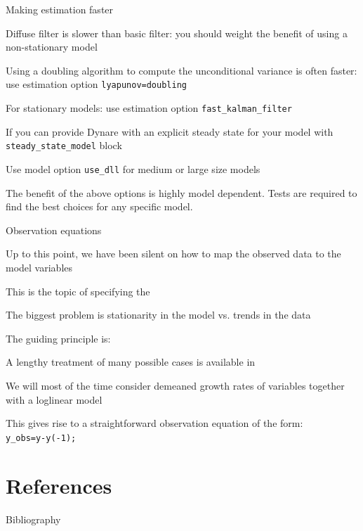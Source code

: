 \documentclass[handout,usepdftitle=false,xcolor=dvipsnames,aspectratio=169]{beamer}
\begin{document}
\begin{frame}{Making estimation faster}
  \begin{witemize}
    \item Diffuse filter is slower than basic filter: you should weight the benefit of using a non-stationary model
    \item Using a doubling algorithm to compute the unconditional variance is often faster: use estimation option
    \texttt{lyapunov=doubling}
    \item For stationary models: use estimation option
    \texttt{fast\_kalman\_filter}
    \item If you can provide Dynare with an explicit steady state for your
    model with \texttt{steady\_state\_model} block
    \item Use model option \texttt{use\_dll} for medium or large size models
    \item The benefit of the above options is highly model dependent.
    Tests are required to find the best choices for any specific
    model.
  \end{witemize}
\end{frame}

\begin{frame}{Observation equations}
  \begin{witemize}
    \item Up to this point, we have been silent on how to map the observed data to the model variables
    \item This is the topic of specifying the 
    \item The biggest problem is stationarity in the model vs. trends in the data
    \item The guiding principle is: 
    \item A lengthy treatment of many possible cases is available in \textcite{Pfeifer2013}
    \item We will most of the time consider demeaned growth rates of variables together with a loglinear model
    \item This gives rise to a straightforward observation equation of the form:\\
    \indent \texttt{y\_obs=y-y(-1);}

  \end{witemize}
\end{frame}


\part{References}
%
\begin{frame}[allowframebreaks]{Bibliography}
  \printbibliography
\end{frame}
\end{document}
